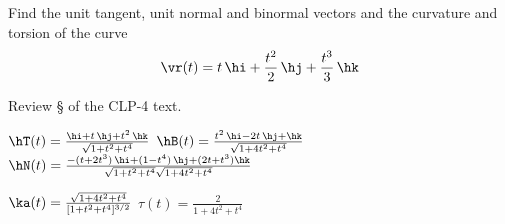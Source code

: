 \begin{question}
Find the unit tangent, unit normal and binormal vectors and
the curvature and torsion of the curve
\begin{equation*}
\vr(t)=t\,\hi + \frac{t^2}{2}\,\hj + \frac{t^3}{3}\,\hk
\end{equation*}
\end{question}

\begin{hint} 
Review \S{} of the CLP-4 text.
\end{hint}

\begin{answer} 
$\hT(t)=\frac{\hi + t\,\hj + t^2\,\hk}{\sqrt{1+t^2+t^4}}$\qquad
$\hB(t)=\frac{t^2\,\hi-2t\,\hj+\hk}{\sqrt{1+4t^2+t^4}}$\qquad
$\hN(t)=\frac{-(t+2t^3)\,\hi+(1-t^4)\,\hj+(2t+t^3)\hk}
            {\sqrt{1+t^2+t^4}\sqrt{1+4t^2+t^4}}$

$\ka(t)=\frac{\sqrt{1+4t^2+t^4}}{[1+t^2+t^4]^{3/2}}$\qquad
$\tau(t)=\frac{2}{1+4t^2+t^4}$
\end{answer}


